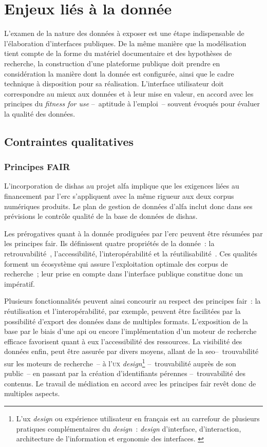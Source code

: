 \documentclass[a4paper,12pt,twoside]{book}
\newcommand{\eng}{\emph}
\newcommand{\bdd}{base de données\xspace}
\newcommand{\g}[1]{\og#1~\fg}
\newcommand{\dishas}{\gls{dishas}\xspace}
\newcommand{\alfa}{\gls{alfa}\xspace}
\newcommand{\erc}{\gls{erc}\xspace}
\newcommand{\fair}{\gls{fair}\xspace}
\newcommand{\api}{\gls{api}\xspace}
\newcommand{\seo}{\gls{seo}\xspace}
\newcommand{\ux}{\gls{ux} \emph{design}\xspace}
\begin{document}
	\section{Enjeux liés à la donnée}
L'examen de la nature des données à exposer est une étape indispensable de l'élaboration d'interfaces publiques. De la même manière que la modélisation tient compte de la forme du matériel documentaire et des hypothèses de recherche, la construction d'une plateforme publique doit prendre en considération la manière dont la donnée est configurée, ainsi que le cadre technique à disposition pour sa réalisation. L'interface utilisateur doit correspondre au mieux aux données et à leur mise en valeur, en accord avec les principes du \eng{fitness for use} –~aptitude à l'emploi~– souvent évoqués pour évaluer la qualité des données.

		\subsection{Contraintes qualitatives}
			\subsubsection{Principes FAIR}
L'incorporation de \dishas au projet \alfa implique que les exigences liées au financement par l'\erc s'appliquent avec la même rigueur aux deux corpus numériques produits. Le plan de gestion de données d'\alfa inclut donc dans ses prévisions le contrôle qualité de la \bdd de \dishas.

Les prérogatives quant à la donnée prodiguées par l'\erc peuvent être résumées par les principes \fair. Ils définissent quatre propriétés de la donnée~: la \g{retrouvabilité}, l'accessibilité, l'interopérabilité et la \g{réutilisabilité}. Ces qualités forment un écosystème qui assure l'exploitation optimale des corpus de recherche~; leur prise en compte dans l'interface publique constitue donc un impératif.

Plusieurs fonctionnalités peuvent ainsi concourir au respect des principes \fair~: la réutilisation et l'interopérabilité, par exemple, peuvent être facilitées par la possibilité d'export des données dans de multiples formats. L'exposition de la base par le biais d'une \api ou encore l'implémentation d'un moteur de recherche efficace favorisent quant à eux l'accessibilité des ressources. La visibilité des données enfin, peut être assurée par divers moyens, allant de la \seo –~trouvabilité sur les moteurs de recherche~– à l'\textsc{ux} \eng{design}\footnote{L'\ux ou expérience utilisateur en français est au carrefour de plusieurs pratiques complémentaires du \eng{design}~: \eng{design} d'interface, d'interaction, architecture de l'information et ergonomie des interfaces. \cite{drouillatDesignInteractifWeb2016}} –~trouvabilité auprès de son public~– en passant par la création d'identifiants pérennes –~trouvabilité des contenus. Le travail de médiation en accord avec les principes \fair revêt donc de multiples aspects.
\end{document}
